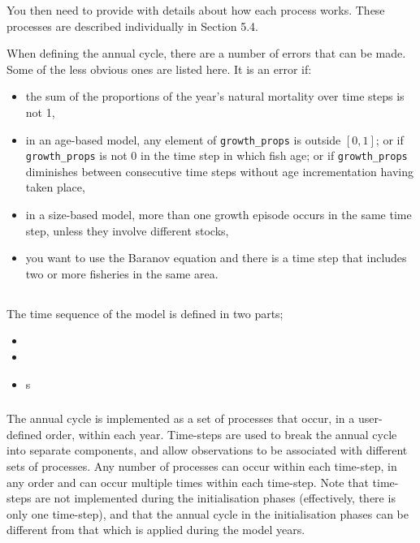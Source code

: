 You then need to provide \cas with details about how each process works. These processes are described individually in Section 5.4. 

When defining the annual cycle, there are a number of errors that can be made. Some of the less obvious ones are listed here. It is an error if: 

\begin{itemize}
\item	the sum of the proportions of the year’s natural mortality over time steps is not 1,
\item	in an age-based model, any element of \texttt{growth\_props} is outside $[0,1]$; or if \texttt{growth\_props} is not 0 in the time step in which fish age; or if \texttt{growth\_props} diminishes between consecutive time steps without age incrementation having taken place,
\item	in a size-based model, more than one growth episode occurs in the same time step, unless they involve different stocks,
\item  you want to use the Baranov equation and there is a time step that includes two or more fisheries in the same area.
\end{itemize}


\subsection{}

The time sequence of the model is defined in two parts;
\begin{itemize}
  \item {}
  \item {}
  \item {}s
\end{itemize}

\subsubsection{}

The annual cycle is implemented as a set of processes that occur, in a user-defined order, within each year. Time-steps are used to break the annual cycle into separate components, and allow observations to be associated with different sets of processes. Any number of processes can occur within each time-step, in any order and can occur multiple times within each time-step. Note that time-steps are not implemented during the initialisation phases (effectively, there is only one time-step), and that the annual cycle in the initialisation phases can be different from that which is applied during the model years.

